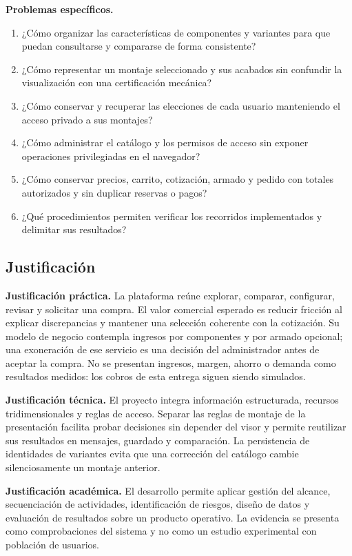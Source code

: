 \documentclass[12pt,letterpaper]{article}
\begin{document}
\textbf{Problemas específicos.}
\begin{enumerate}
\item ¿Cómo organizar las características de componentes y variantes para que puedan consultarse y compararse de forma consistente?
\item ¿Cómo representar un montaje seleccionado y sus acabados sin confundir la visualización con una certificación mecánica?
\item ¿Cómo conservar y recuperar las elecciones de cada usuario manteniendo el acceso privado a sus montajes?
\item ¿Cómo administrar el catálogo y los permisos de acceso sin exponer operaciones privilegiadas en el navegador?
\item ¿Cómo conservar precios, carrito, cotización, armado y pedido con totales autorizados y sin duplicar reservas o pagos?
\item ¿Qué procedimientos permiten verificar los recorridos implementados y delimitar sus resultados?
\end{enumerate}

\subsection{Justificación}
\textbf{Justificación práctica.} La plataforma reúne explorar, comparar, configurar, revisar y solicitar una compra. El valor comercial esperado es reducir fricción al explicar discrepancias y mantener una selección coherente con la cotización. Su modelo de negocio contempla ingresos por componentes y por armado opcional; una exoneración de ese servicio es una decisión del administrador antes de aceptar la compra. No se presentan ingresos, margen, ahorro o demanda como resultados medidos: los cobros de esta entrega siguen siendo simulados.

\textbf{Justificación técnica.} El proyecto integra información estructurada, recursos tridimensionales y reglas de acceso. Separar las reglas de montaje de la presentación facilita probar decisiones sin depender del visor y permite reutilizar sus resultados en mensajes, guardado y comparación. La persistencia de identidades de variantes evita que una corrección del catálogo cambie silenciosamente un montaje anterior.

\textbf{Justificación académica.} El desarrollo permite aplicar gestión del alcance, secuenciación de actividades, identificación de riesgos, diseño de datos y evaluación de resultados sobre un producto operativo. La evidencia se presenta como comprobaciones del sistema y no como un estudio experimental con población de usuarios.
\end{document}
